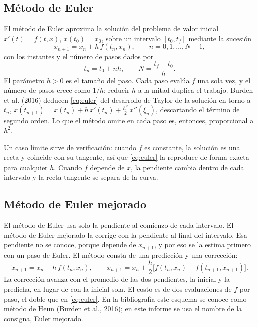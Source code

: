 \subsection{Método de Euler}
\label{subsec:euler}

El método de Euler aproxima la solución del problema de valor inicial
$x'(t) = f(t, x)$, $x(t_0) = x_0$, sobre un intervalo $[t_0, t_f]$ mediante la sucesión
\begin{equation}
  x_{n+1} = x_n + h\, f(t_n, x_n), \qquad n = 0, 1, \ldots, N - 1 ,
  \label{eq:euler}
\end{equation}
con los instantes y el número de pasos dados por
\begin{equation}
  t_n = t_0 + n h, \qquad N = \frac{t_f - t_0}{h} .
  \label{eq:tiempos}
\end{equation}
El parámetro $h > 0$ es el tamaño del paso. Cada paso evalúa $f$ una sola vez, y el número de
pasos crece como $1/h$: reducir $h$ a la mitad duplica el trabajo. Burden et al. (2016) deducen
\eqref{eq:euler} del desarrollo de Taylor de la solución en torno a $t_n$,
$x(t_{n+1}) = x(t_n) + h\, x'(t_n) + \tfrac{h^2}{2}\, x''(\xi_n)$, descartando el término de
segundo orden. Lo que el método omite en cada paso es, entonces, proporcional a $h^2$.

Un caso límite sirve de verificación: cuando $f$ es constante, la solución es una recta y
coincide con su tangente, así que \eqref{eq:euler} la reproduce de forma exacta para cualquier
$h$. Cuando $f$ depende de $x$, la pendiente cambia dentro de cada intervalo y la recta tangente
se separa de la curva.

\subsection{Método de Euler mejorado}
\label{subsec:euler-mejorado}

El método de Euler usa solo la pendiente al comienzo de cada intervalo. El método de Euler
mejorado la corrige con la pendiente al final del intervalo. Esa pendiente no se conoce, porque
depende de $x_{n+1}$, y por eso se la estima primero con un paso de Euler. El método consta de
una predicción y una corrección:
\begin{equation}
  \tilde{x}_{n+1} = x_n + h\, f(t_n, x_n), \qquad
  x_{n+1} = x_n + \frac{h}{2} \bigl[ f(t_n, x_n) + f(t_{n+1}, \tilde{x}_{n+1}) \bigr] .
  \label{eq:heun}
\end{equation}
La corrección avanza con el promedio de las dos pendientes, la inicial y la predicha, en lugar
de con la inicial sola. El costo es de dos evaluaciones de $f$ por paso, el doble que en
\eqref{eq:euler}. En la bibliografía este esquema se conoce como método de Heun (Burden et al.,
2016); en este informe se usa el nombre de la consigna, Euler mejorado.


